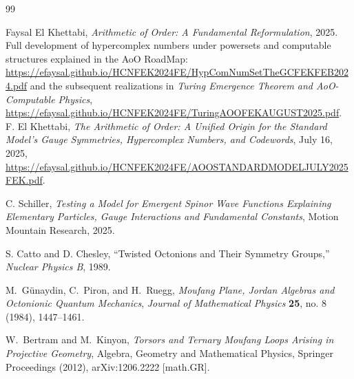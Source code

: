 \documentclass[12pt]{article}
\theoremstyle{remark}
\begin{document}
\begin{thebibliography}{99}

Faysal El Khettabi,
\textit{Arithmetic of Order: A Fundamental Reformulation}, 2025.
Full development of hypercomplex numbers under powersets and computable structures explained in the AoO RoadMap:
\url{https://efaysal.github.io/HCNFEK2024FE/HypComNumSetTheGCFEKFEB2024.pdf} and the subsequent realizations in \textit{Turing Emergence Theorem and AoO-Computable Physics},
\url{https://efaysal.github.io/HCNFEK2024FE/TuringAOOFEKAUGUST2025.pdf}.
F. El Khettabi,
\emph{The Arithmetic of Order: A Unified Origin for the Standard Model’s Gauge Symmetries, Hypercomplex Numbers, and Codewords},
July 16, 2025,
\url{https://efaysal.github.io/HCNFEK2024FE/AOOSTANDARDMODELJULY2025FEK.pdf}.

C. Schiller,
\textit{Testing a Model for Emergent Spinor Wave Functions Explaining Elementary Particles, Gauge Interactions and Fundamental Constants},
Motion Mountain Research, 2025.

S. Catto and D. Chesley,
``Twisted Octonions and Their Symmetry Groups,''
\textit{Nuclear Physics B}, 1989.

M.~Günaydin, C.~Piron, and H.~Ruegg,
\emph{Moufang Plane, Jordan Algebras and Octonionic Quantum Mechanics},  
\textit{Journal of Mathematical Physics} \textbf{25}, no. 8 (1984), 1447–1461.

W.~Bertram and M.~Kinyon,
\emph{Torsors and Ternary Moufang Loops Arising in Projective Geometry},
Algebra, Geometry and Mathematical Physics, Springer Proceedings (2012),
arXiv:1206.2222 [math.GR].

\end{thebibliography}
\end{document}
